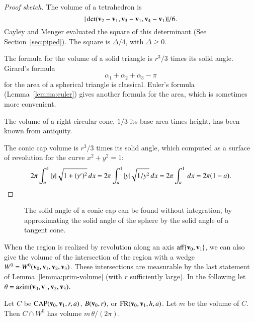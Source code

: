 \begin{proof}[Proof sketch]
The volume of a tetrahedron is
\[ 
|\det({\mathbf v}_2-{\mathbf v}_1,{\mathbf v}_3-{\mathbf v}_1,{\mathbf v}_4-{\mathbf v}_1)|/6.
\] 
Cayley and Menger evaluated the square of this determinant (See
Section~\ref{sec:piped}).  The square is $\Delta/4$, with
$\Delta\ge0$.  
%

The formula for the volume of a solid triangle is $r^3/3$ times
its solid angle.  Girard's formula
\[ \alpha_1+\alpha_2+\alpha_3-\pi\label{eqn:girard}\] 
for the area of a spherical triangle is classical.  Euler's formula
(Lemma~\ref{lemma:euler}) gives another formula for the area, which is
sometimes more convenient.
%
%
%

The volume of a right-circular cone, $1/3$ its base area times height,
has been known from antiquity.  

The conic cap volume is $r^3/3$ times its solid angle, which computed as a
 surface of revolution for the curve $x^2 + y^2 = 1$:
\[ 
2\pi \int_a^1  |y| \sqrt{1 + (y')^2}\,dx 
= 2\pi\int_a^1  |y| \sqrt{1/y^2}\,dx 
= 2\pi \int_a^1\,dx = 2\pi (1-a).\qedhere
\]
\end{proof}

\begin{figure}[htb]
\centering
{}
\caption{The solid angle of a conic cap can be found without integration, by approximating
the solid angle of the sphere by the solid angle of a tangent cone.}
\label{fig:dart}
\end{figure}





%

When the region is realized by revolution along an axis
${\operatorname{aff}}\{{\mathbf v}_0,{\mathbf v}_1\}$, we can also give the volume of the
intersection of the region with a wedge
$W^0=W^0({\mathbf v}_0,{\mathbf v}_1,{\mathbf v}_2,{\mathbf v}_3)$.  These intersections are measurable by
the last statement of Lemma~\ref{lemma:prim-volume} (with $r$
sufficiently large).  In the following let $\theta =
{\operatorname{azim}}({\mathbf v}_0,{\mathbf v}_1,{\mathbf v}_2,{\mathbf v}_3)$.  %
%

\begin{lemma}\label{lemma:wedge-vol}  
Let $C$ be ${\operatorname{CAP}}({\mathbf v}_0,{\mathbf v}_1,r,a)$, $B({\mathbf v}_0,r)$,  
or ${\operatorname{FR}}({\mathbf v}_0,{\mathbf v}_1,h,a)$.  Let $m$ be the volume of $C$.  Then
$C\cap W^0$ has volume $m\,\theta/(2\pi)$.
\end{lemma}
%


